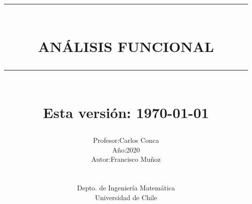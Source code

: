 
\newcommand{\HRule}[1]{\rule{\linewidth}{#1}} 	%

\makeatletter							%
\def\printtitle{%
    {\centering \@title\par}}
\makeatother									

\makeatletter							%
\def\printauthor{%
    {\centering \large \@author}}				
\makeatother							

\title{     \HRule{1pt} \\[12pt]						%
			 \textbf{\uppercase{\LARGE Análisis Funcional}}	%
			\HRule{1.5pt} \\ [0.2cm]		%
			\large Esta versión: \today
		}

\author{
    \begin{tabular}{rl}
        Profesor: & Carlos Conca\\
        Año: & 2020\\
		Autor: & Francisco Muñoz
    \end{tabular}\\[1.25pt]
    \begin{center}
        Depto. de Ingeniería Matemática \\
        Universidad de Chile \\[1.25cm]
    \end{center}
}
